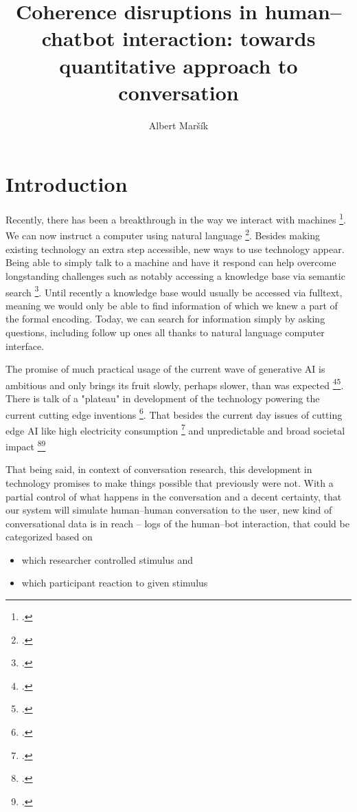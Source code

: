 \documentclass[12pt]{report}
\title{Coherence disruptions in human–chatbot interaction: towards quantitative approach to conversation}
\date{}
\author{Albert Maršík}
\begin{document}

\maketitle

\chapter*{Introduction}

\par
Recently, there has been a breakthrough in the way we interact with machines \footcite{sharma2024exploring}.
We can now instruct a computer using natural language \footcite{hendrix1982natural}.
Besides making existing technology an extra step accessible,
new ways to use technology appear.
Being able to simply talk to a machine and have it respond
can help overcome longstanding challenges
such as notably accessing a knowledge base via semantic search \footcite{makela2005survey}.
Until recently a knowledge base would usually be accessed via fulltext,
meaning we would only be able to find
information of which we knew a part of the formal encoding.
Today, we can search for information simply by asking questions,
including follow up ones
all thanks to natural language computer interface.
\par
The promise of much practical usage of the current wave of generative AI is ambitious
and only brings its fruit slowly, perhaps slower, than was expected
\footcite{bloomberg2024openai1}\footcite{reuters2024openai}.
There is talk of a "plateau" in development of the technology powering
the current cutting edge inventions \footcite{ritter2024ai}.
That besides the current day issues of cutting edge AI like
high electricity consumption \footcite{ritchie2024ai} and
unpredictable and broad societal impact \footcite{hagerty2019global}\footcite{baldassarre2023social}

That being said, in context of conversation research,
this development in technology promises to make things possible that previously were not.
With a partial control of what happens in the conversation and a decent certainty, that
our system will simulate human–human conversation to the user,
new kind of conversational data is in reach –
logs of the human–bot interaction, that could be categorized based on

\begin{itemize}
    \item
    which researcher controlled stimulus and
    \item
    which participant reaction to given stimulus
\end{itemize}
\end{document}
